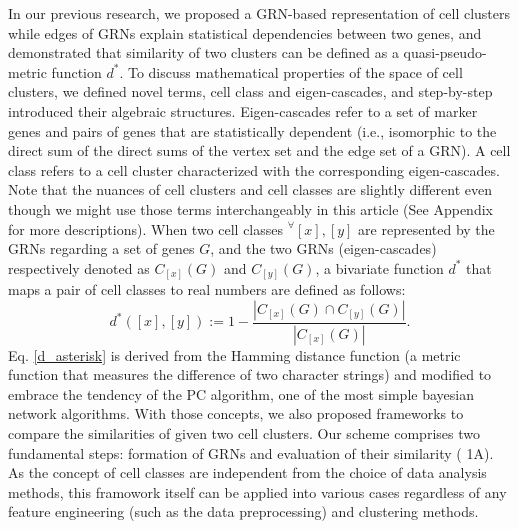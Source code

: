 \documentclass{article}
\begin{document}
In our previous research, we proposed a \ac{GRN}-based representation of cell clusters 
while edges of GRNs explain statistical dependencies between two genes, and demonstrated that similarity of two 
clusters can be defined as a quasi-pseudo-metric function $d^*$\cite{okano2023set}. To discuss mathematical properties of the space of 
cell clusters, we defined novel terms, cell class and eigen-cascades, and step-by-step introduced their algebraic 
structures. Eigen-cascades refer to a set of marker genes and pairs of genes that are statistically dependent (i.e., 
isomorphic to the direct sum of the direct sums of the vertex set and the edge set of a GRN). A cell class refers to 
a cell cluster characterized with the corresponding eigen-cascades. Note that the nuances of cell clusters and cell 
classes are slightly different even though we might use those terms interchangeably in this article (See Appendix 
for more descriptions). When two cell classes $^\forall[x], [y]$ are represented by the GRNs regarding a set of genes $G$, and 
the two GRNs (eigen-cascades) respectively denoted as $C_{[x]}(G)$ and $C_{[y]}(G)$, a bivariate function $d^*$ that maps a 
pair of cell classes to real numbers are defined as follows\cite{okano2023set}:
\begin{equation}\label{d_asterisk}
  d^*([x], [y]) := 1 - \frac{|C_{[x]}(G)\cap C_{[y]}(G)|}{|C_{[x]}(G)|}.
\end{equation}
Eq. \eqref{d_asterisk} is derived from the Hamming distance function (a metric function that measures the difference of two 
character strings) and modified to embrace the tendency of the \ac{PC} algorithm, one of the most 
simple bayesian network algorithms\cite{okano2023set,bookstein2002generalized, spirtes2000causation}. With those concepts, we also proposed frameworks to compare the 
similarities of given two cell clusters. Our scheme comprises two fundamental steps: formation of GRNs and 
evaluation of their similarity (\figurename{ 1A}). As the concept of cell classes are independent from the choice of data 
analysis methods, this framowork itself can be applied into various cases regardless of any feature engineering (such 
as the data preprocessing) and clustering methods.
\end{document}
